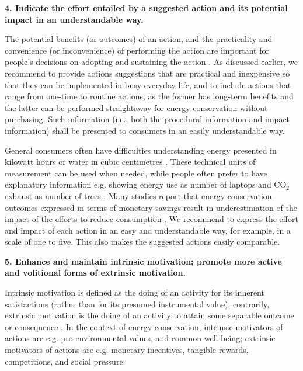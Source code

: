 \vspace{.3cm}
\noindent\textbf{4. Indicate the effort entailed by a suggested action and its potential impact in an understandable way.}

The potential benefits (or outcomes) of an action, and the practicality and convenience (or inconvenience) of performing the action are important for people's decisions on adopting and sustaining the action  \citep{Schultz2002,Claudy2013}. As discussed earlier, we recommend to provide actions suggestions that are practical and inexpensive so that they can be implemented in busy everyday life, and to include actions that range from one-time to routine actions, as the former has long-term benefits and the latter can be performed straightaway for energy conservation without purchasing. Such information (i.e., both the procedural information and impact information) shall be presented to consumers in an easily understandable way. 

General consumers often have difficulties understanding energy presented in kilowatt
hours or water in cubic centimetres  \citep{Froehlich2009}. These technical units of measurement can be used when needed, while people often prefer to have explanatory information e.g. showing energy use as number of laptops and CO$_{2}$ exhaust as number of trees  \citep{Petkov2011}. Many studies report that energy conservation outcomes expressed in terms of monetary savings result in underestimation of the impact of the efforts to reduce consumption  \citep{Froehlich2009,Pierce2010,Abrahamse2013}. We recommend to express the effort and impact of each action in an easy and understandable way, for example, in a scale of one to five. This also makes the suggested actions easily comparable. 


\vspace{.3cm}
\noindent\textbf{5. Enhance and maintain intrinsic motivation; promote more active and volitional forms of extrinsic motivation.}

Intrinsic motivation is defined as the doing of an activity for its inherent satisfactions (rather than for its presumed instrumental value); contrarily, extrinsic motivation is the doing of an activity to attain some separable outcome or consequence  \citep{Ryan2000}. In the context of energy conservation, intrinsic motivators of actions are e.g. pro-environmental values, and common well-being; extrinsic motivators of actions are e.g. monetary incentives, tangible rewards, competitions, and social pressure. 


